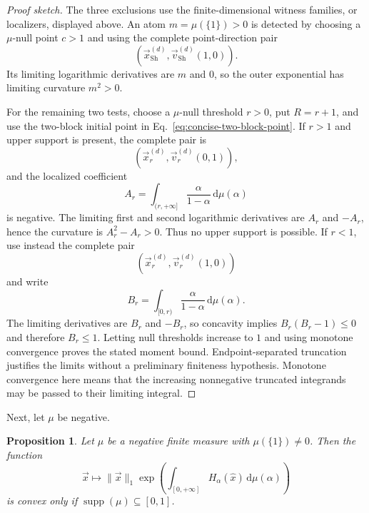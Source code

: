 \documentclass[aps,pra,11pt,onecolumn,nofootinbib,tightenlines]{revtex4-2}
\newtheorem{proposition}[theorem]{Proposition}
\theoremstyle{definition}
\def \d {\mathrm{d}}
\begin{document}
\begin{proof}[Proof sketch]
The three exclusions use the finite-dimensional witness families, or
localizers, displayed above.  An atom
$m=\mu(\{1\})>0$ is detected by choosing a $\mu$-null point $c>1$ and using
the complete point-direction pair
\begin{equation}
\left(
\vec{x}_{\mathrm{Sh}}^{(d)},
\vec{v}_{\mathrm{Sh}}^{(d)}(1,0)
\right).
\label{eq:positive-Shannon-witness-pair}
\end{equation}
Its limiting logarithmic derivatives are $m$ and $0$, so the outer exponential
has limiting curvature $m^2>0$.

For the remaining two tests, choose a $\mu$-null threshold $r>0$, put
$R=r+1$, and use the two-block initial point in
Eq.~\eqref{eq:concise-two-block-point}.  If $r>1$ and upper support is present,
the complete pair is
\begin{equation}
\left(
\vec{x}_r^{(d)},
\vec{v}_r^{(d)}(0,1)
\right),
\label{eq:positive-upper-witness-pair}
\end{equation}
and the localized coefficient
\[
A_r=\int_{(r,+\infty]}\frac{\alpha}{1-\alpha}\,\d\mu(\alpha)
\]
is negative.  The limiting first and second logarithmic derivatives are $A_r$
and $-A_r$, hence the curvature is $A_r^2-A_r>0$.  Thus no upper support is
possible.  If $r<1$, use instead the complete pair
\begin{equation}
\left(
\vec{x}_r^{(d)},
\vec{v}_r^{(d)}(1,0)
\right)
\label{eq:positive-lower-witness-pair}
\end{equation}
and write
\[
B_r=\int_{[0,r)}\frac{\alpha}{1-\alpha}\,\d\mu(\alpha).
\]
The limiting derivatives are $B_r$ and $-B_r$, so concavity implies
$B_r(B_r-1)\leq0$ and therefore $B_r\leq1$.
Letting null thresholds increase to $1$ and using monotone convergence proves
the stated moment bound.  Endpoint-separated truncation justifies the limits
without a preliminary finiteness hypothesis.
Monotone convergence here means that the increasing nonnegative truncated
integrands may be passed to their limiting integral.
\end{proof}

Next, let $\mu$ be negative.

\begin{proposition}
\label{prop:no-alpha-one}
Let $\mu$ be a negative finite measure with $\mu(\{1\})\neq0$.  Then the function
\begin{equation}
\vec{x}\longmapsto\|\vec{x}\|_1
\exp\!\left(\int_{[0,+\infty]}H_\alpha(\hat{x})\,
\d\mu(\alpha)\right)
\end{equation}
is convex only if $\operatorname{supp}(\mu)\subseteq[0,1]$.
\end{proposition}
\end{document}
